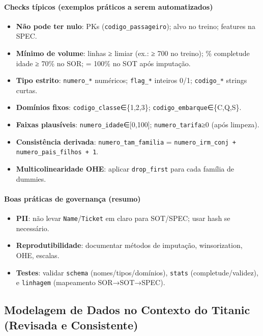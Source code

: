 \documentclass[12pt,a4paper]{article}
\begin{document}
\paragraph{Checks típicos (exemplos práticos a serem automatizados)}
\begin{itemize}[leftmargin=1.25em]
  \item \textbf{Não pode ter nulo}: PKs (\texttt{codigo\_passageiro}); alvo no treino; features na SPEC.
  \item \textbf{Mínimo de volume}: linhas ≥ limiar (ex.: ≥ 700 no treino); \% completude idade ≥ 70\% no SOR; = 100\% no SOT após imputação.
  \item \textbf{Tipo estrito}: \texttt{numero\_*} numéricos; \texttt{flag\_*} inteiros 0/1; \texttt{codigo\_*} strings curtas.
  \item \textbf{Domínios fixos}: \texttt{codigo\_classe}∈\{1,2,3\}; \texttt{codigo\_embarque}∈\{C,Q,S\}.
  \item \textbf{Faixas plausíveis}: \texttt{numero\_idade}∈[0,100]; \texttt{numero\_tarifa}≥0 (após limpeza).
  \item \textbf{Consistência derivada}: \texttt{numero\_tam\_familia} = \texttt{numero\_irm\_conj + numero\_pais\_filhos + 1}.
  \item \textbf{Multicolinearidade OHE}: aplicar \texttt{drop\_first} para cada família de dummies.
\end{itemize}

\paragraph{Boas práticas de governança (resumo)}
\begin{itemize}[leftmargin=1.25em]
  \item \textbf{PII}: não levar \texttt{Name}/\texttt{Ticket} em claro para SOT/SPEC; usar hash se necessário.
  \item \textbf{Reprodutibilidade}: documentar métodos de imputação, winsorization, OHE, escalas.
  \item \textbf{Testes}: validar \texttt{schema} (nomes/tipos/domínios), \texttt{stats} (completude/validez), e \texttt{linhagem} (mapeamento SOR→SOT→SPEC).
\end{itemize}




\subsection{Modelagem de Dados no Contexto do Titanic (Revisada e Consistente)}
\end{document}
